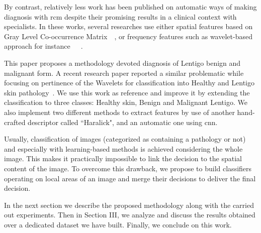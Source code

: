 By contrast, relatively less work has been published on automatic ways of making diagnosis with \ac{rcm} despite their promising results in a clinical context with specialists. In these works, several researches use either spatial features based on Gray Level Co-occurrence Matrix~\cite{Wiltgen2008}~\cite{Koller2011}, or frequency features such as wavelet-based approach for instance~\cite{Wiltgen2008}~\cite{Koller2011}~\cite{Halimi2017a}.\par 
This paper proposes a methodology devoted diagnosis of Lentigo benign and malignant form. A recent research paper reported a similar problematic while focusing on pertinence of the Wavelets for classification into Healthy and Lentigo skin pathology~\cite{Halimi2017a}. We use this work as reference and improve it by extending the classification to three classes: Healthy skin, Benign and Malignant Lentigo. We also implement two different methods to extract features by use of another hand-crafted descriptor called “Haralick", and an automatic one using \ac{cnn}.\par
Usually, classification of images (categorized as containing a pathology or not) and especially with learning-based methods is achieved considering the whole image. This makes it practically impossible to link the decision to the spatial content of the image. To overcome this drawback, we propose to build classifiers operating on local areas of an image and merge their decisions to deliver the final decision.\par
In the next section we describe the proposed methodology along with the carried out experiments. Then in Section III, we analyze and discuss the results obtained over a dedicated dataset we have built. Finally, we conclude on this work.\par